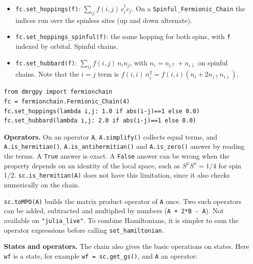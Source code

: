 \documentclass[11pt]{article}
\providecommand{\tightlist}{\setlength{\itemsep}{0pt}\setlength{\parskip}{0pt}}
\begin{document}
\begin{itemize}
\tightlist
\item
  \texttt{fc.\allowbreak{}set\_\allowbreak{}hoppings(f)}: \(\sum_{ij}f(i,j)\,c_i^\dagger c_j\). On a
  \texttt{Spinful\_\allowbreak{}Fermionic\_\allowbreak{}Chain} the indices run over the spinless sites
  (up and down alternate).
\item
  \texttt{fc.\allowbreak{}set\_\allowbreak{}hoppings\_\allowbreak{}spinful(f)}: the same hopping for both spins, with \texttt{f}
  indexed by orbital. Spinful chains.
\item
  \texttt{fc.\allowbreak{}set\_\allowbreak{}hubbard(f)}: \(\sum_{ij}f(i,j)\,n_in_j\), with
  \(n_i=n_{i\uparrow}+n_{i\downarrow}\) on spinful chains. Note that the
  \(i=j\) term is \(f(i,i)\,n_i^2=f(i,i)(n_i+2n_{i\uparrow}n_{i\downarrow})\).
\end{itemize}

\begin{lstlisting}
from dmrgpy import fermionchain
fc = fermionchain.Fermionic_Chain(4)
fc.set_hoppings(lambda i,j: 1.0 if abs(i-j)==1 else 0.0)
fc.set_hubbard(lambda i,j: 2.0 if abs(i-j)==1 else 0.0)
\end{lstlisting}

\textbf{Operators.} On an operator \texttt{A}, \texttt{A.\allowbreak{}simplify()} collects equal terms,
and \texttt{A.\allowbreak{}is\_\allowbreak{}hermitian()}, \texttt{A.\allowbreak{}is\_\allowbreak{}antihermitian()} and \texttt{A.\allowbreak{}is\_\allowbreak{}zero()} answer by
reading the terms. A \texttt{True} answer is exact. A \texttt{False} answer can be wrong
when the property depends on an identity of the local space, such as
\(S^xS^x=1/4\) for spin 1/2. \texttt{sc.\allowbreak{}is\_\allowbreak{}hermitian(A)} does not have this
limitation, since it also checks numerically on the chain.

\texttt{sc.\allowbreak{}toMPO(A)} builds the matrix product operator of \texttt{A} once. Two such
operators can be added, subtracted and multiplied by numbers
(\texttt{A\ +\ 2*B\ -\ A}). Not available on \texttt{"julia\_\allowbreak{}live"}. To combine Hamiltonians,
it is simpler to sum the operator expressions before calling
\texttt{set\_\allowbreak{}hamiltonian}.

\textbf{States and operators.} The chain also gives the basic operations on
states. Here \texttt{wf} is a state, for example \texttt{wf\ =\ sc.\allowbreak{}get\_\allowbreak{}gs()}, and \texttt{A} an
operator:
\end{document}
